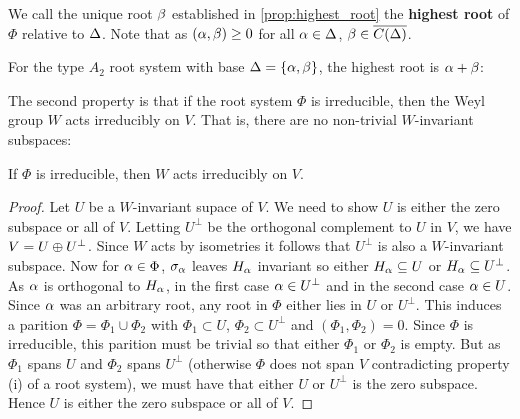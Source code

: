 \documentclass[12pt,reqno,oneside]{amsart}
\begin{document}
    We call the unique root $\beta$ established in \cref{prop:highest_root} the \textbf{highest root} of $\Phi$ relative to $\Delta$. Note that as $(\alpha,\beta) \ge 0$ for all $\alpha \in \Delta$, $\beta \in \overline{C(\Delta)}$.

    For the type $A_{2}$ root system with base $\Delta = \{\alpha,\beta\}$, the highest root is $\alpha+\beta$:
    
    \begin{center}
    \end{center}

    The second property is that if the root system $\Phi$ is irreducible, then the Weyl group $W$ acts irreducibly on $V$. That is, there are no non-trivial $W$-invariant subspaces:

    \begin{proposition}\label{prop:Weyl_group_acts_irreducibly}
        If $\Phi$ is irreducible, then $W$ acts irreducibly on $V$.
    \end{proposition}
    \begin{proof}
        Let $U$ be a $W$-invariant supace of $V$. We need to show $U$ is either the zero subspace or all of $V$. Letting $U^{\perp}$ be the orthogonal complement to $U$ in $V$, we have $V = U \oplus U^{\perp}$. Since $W$ acts by isometries it follows that $U^{\perp}$ is also a $W$-invariant subspace. Now for $\alpha \in \Phi$, $\sigma_{\alpha}$ leaves $H_{\alpha}$ invariant so either $H_{\alpha} \subseteq U$ or $H_{\alpha} \subseteq U^{\perp}$. As $\alpha$ is orthogonal to $H_{\alpha}$, in the first case $\alpha \in U^{\perp}$ and in the second case $\alpha \in U$. Since $\alpha$ was an arbitrary root, any root in $\Phi$ either lies in $U$ or $U^{\perp}$. This induces a parition $\Phi = \Phi_{1} \cup \Phi_{2}$ with $\Phi_{1} \subset U$, $\Phi_{2} \subset U^{\perp}$ and $(\Phi_{1},\Phi_{2}) = 0$. Since $\Phi$ is irreducible, this parition must be trivial so that either $\Phi_{1}$ or $\Phi_{2}$ is empty. But as $\Phi_{1}$ spans $U$ and $\Phi_{2}$ spans $U^{\perp}$ (otherwise $\Phi$ does not span $V$ contradicting property (i) of a root system), we must have that either $U$ or $U^{\perp}$ is the zero subspace. Hence $U$ is either the zero subspace or all of $V$.
    \end{proof}
\end{document}
